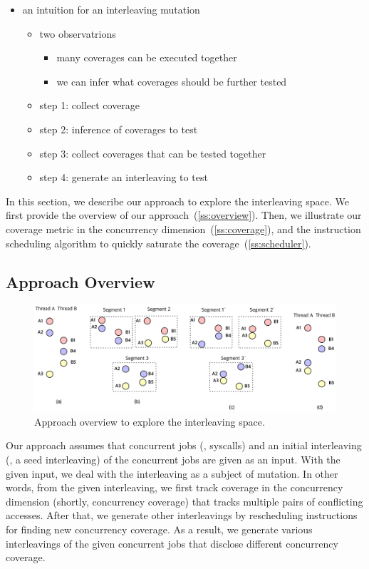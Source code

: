 {\begin{itemize}
\item an intuition for an interleaving mutation
  \begin{itemize}
  \item two observatrions
    \begin{itemize}
      \item many coverages can be executed together
      \item we can infer what coverages should be further tested
      \end{itemize}
  \item step 1: collect coverage
  \item step 2: inference of coverages to test
  \item step 3: collect coverages that can be tested together
  \item step 4: generate an interleaving to test
  \end{itemize}
\end{itemize}
}


In this section, we describe our approach to explore the interleaving
space.
%
We first provide the overview of our
approach~(\autoref{ss:overview}). Then, we illustrate our coverage
metric in the concurrency dimension~(\autoref{ss:coverage}), and the
instruction scheduling algorithm to quickly saturate the
coverage~(\autoref{ss:scheduler}).

\subsection{Approach Overview}
\label{ss:overview}

\begin{figure}[ht]
  \includegraphics[width=0.9\linewidth]{fig/intuition.pdf}
  \caption{Approach overview to explore the interleaving
    space. }
  \label{fig:overview}
\end{figure}



Our approach assumes that concurrent jobs (\eg, syscalls) and an
initial interleaving (\eg, a seed interleaving) of the concurrent jobs
are given as an input.
%
With the given input, we deal with the interleaving as a subject of
mutation. In other words, from the given interleaving, we first track
coverage in the concurrency dimension (shortly, concurrency coverage)
that tracks multiple pairs of conflicting accesses. After that, we
generate other interleavings by rescheduling instructions for finding
new concurrency coverage.
%
As a result, we generate various interleavings of the given concurrent
jobs that disclose different concurrency coverage.

